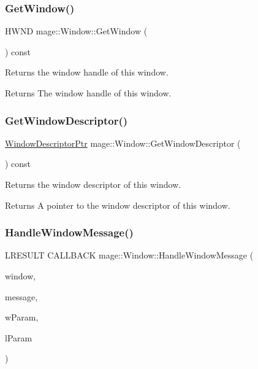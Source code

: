 \subsubsection{\texorpdfstring{Get\+Window()}{GetWindow()}}
{\footnotesize\ttfamily H\+W\+ND mage\+::\+Window\+::\+Get\+Window (\begin{DoxyParamCaption}{ }\end{DoxyParamCaption}) const\hspace{0.3cm}{\ttfamily [noexcept]}}

Returns the window handle of this window.

\begin{DoxyReturn}{Returns}
The window handle of this window. 
\end{DoxyReturn}
\hypertarget{classmage_1_1_window_add5b20d191810ba04000728c7517543f}{}\label{classmage_1_1_window_add5b20d191810ba04000728c7517543f} 
\subsubsection{\texorpdfstring{Get\+Window\+Descriptor()}{GetWindowDescriptor()}}
{\footnotesize\ttfamily \hyperlink{classmage_1_1_window_ac41b052d8e8dd0571b3ec862e8f6da05}{Window\+Descriptor\+Ptr} mage\+::\+Window\+::\+Get\+Window\+Descriptor (\begin{DoxyParamCaption}{ }\end{DoxyParamCaption}) const\hspace{0.3cm}{\ttfamily [noexcept]}}

Returns the window descriptor of this window.

\begin{DoxyReturn}{Returns}
A pointer to the window descriptor of this window. 
\end{DoxyReturn}
\hypertarget{classmage_1_1_window_a1bd8a958bb5e15f22982a74a513a715e}{}\label{classmage_1_1_window_a1bd8a958bb5e15f22982a74a513a715e} 
\subsubsection{\texorpdfstring{Handle\+Window\+Message()}{HandleWindowMessage()}\hspace{0.1cm}{\footnotesize\ttfamily [1/2]}}
{\footnotesize\ttfamily L\+R\+E\+S\+U\+LT C\+A\+L\+L\+B\+A\+CK mage\+::\+Window\+::\+Handle\+Window\+Message (\begin{DoxyParamCaption}\item[{H\+W\+ND}]{window,  }\item[{U\+I\+NT}]{message,  }\item[{W\+P\+A\+R\+AM}]{w\+Param,  }\item[{L\+P\+A\+R\+AM}]{l\+Param }\end{DoxyParamCaption})\hspace{0.3cm}{\ttfamily [static]}}

